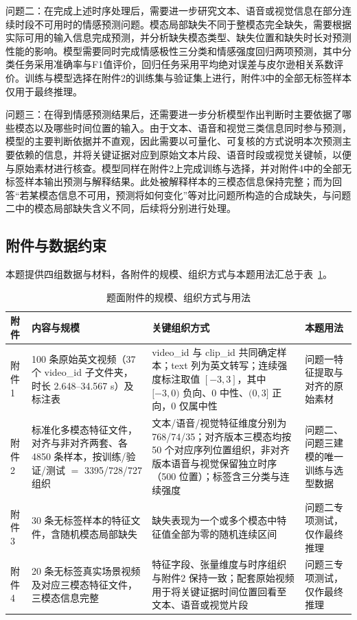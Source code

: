 \documentclass[colorprint,nocoverzero]{gmcmthesis}
\begin{document}
问题二：在完成上述时序处理后，需要进一步研究文本、语音或视觉信息在部分连续时段不可用时的情感预测问题。模态局部缺失不同于整模态完全缺失，需要根据实际可用的输入信息完成预测，并分析缺失模态类型、缺失位置和缺失时长对预测性能的影响。模型需要同时完成情感极性三分类和情感强度回归两项预测，其中分类任务采用准确率与F1值评价，回归任务采用平均绝对误差与皮尔逊相关系数评价。训练与模型选择在附件2的训练集与验证集上进行，附件3中的全部无标签样本仅用于最终推理。

问题三：在得到情感预测结果后，还需要进一步分析模型作出判断时主要依据了哪些模态以及哪些时间位置的输入。由于文本、语音和视觉三类信息同时参与预测，模型的主要判断依据并不直观，因此需要以可量化、可复核的方式说明本次预测主要依赖的信息，并将关键证据对应到原始文本片段、语音时段或视觉关键帧，以便与原始素材进行核查。模型同样在附件2上完成训练与选择，并对附件4中的全部无标签样本输出预测与解释结果。此处被解释样本的三模态信息保持完整；而为回答“若某模态信息不可用，预测将如何变化”等对比问题所构造的合成缺失，与问题二中的模态局部缺失含义不同，后续将分别进行处理。

\subsection{附件与数据约束}\label{subsec:restatement-attachments}
本题提供四组数据与材料，各附件的规模、组织方式与本题用法汇总于表~\ref{tab:attachments}。

\begin{table}[H]
  \centering
  \caption{题面附件的规模、组织方式与用法}
  \label{tab:attachments}
  \small
  \begin{tabularx}{\textwidth}{@{}p{13mm}p{42mm}Xp{27mm}@{}}
    \toprule
    附件 & 内容与规模 & 关键组织方式 & 本题用法 \\
    \midrule
    附件1 & 100 条原始英文视频（37 个 video\_id 子文件夹，时长 2.648--34.567 s）及标注表 & video\_id 与 clip\_id 共同确定样本；text 列为英文转写；连续强度标注取值 $[-3,3]$，其中 $[-3,0)$ 负向、$0$ 中性、$(0,3]$ 正向，$0$ 仅属中性 & 问题一特征提取与对齐的原始素材 \\
    附件2 & 标准化多模态特征文件，对齐与非对齐两套、各 4850 条样本，按训练/验证/测试 $=$ 3395/728/727 组织 & 文本/语音/视觉特征维度分别为 768/74/35；对齐版本三模态均按 50 个对应序列位置组织，非对齐版本语音与视觉保留独立时序（500 位置）；标签含三分类与连续强度 & 问题二、问题三建模的唯一训练与选型数据 \\
    附件3 & 30 条无标签样本的特征文件，含随机模态局部缺失 & 缺失表现为一个或多个模态中特征值全部为零的随机连续区间 & 问题二专项测试，仅作最终推理 \\
    附件4 & 20 条无标签真实场景视频及对应三模态特征文件，三模态信息完整 & 特征字段、张量维度与时序组织与附件2 保持一致；配套原始视频用于将关键证据时间位置回看至文本、语音或视觉片段 & 问题三专项测试，仅作最终推理 \\
    \bottomrule
  \end{tabularx}
\end{table}
\end{document}
